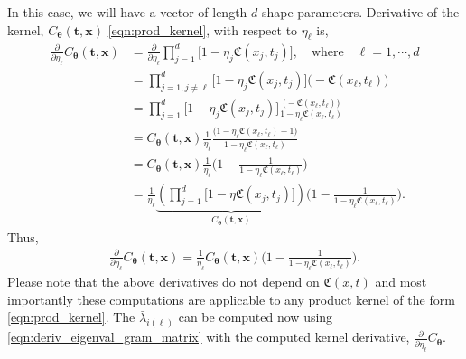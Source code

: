 \documentclass{iitthesis}          %
\newcommand{\bm}[1]{\boldsymbol{#1}}
\newcommand{\vtheta}{{\bm{\theta}}}
\newcommand{\vt}{\bm{t}}
\newcommand{\vx}{\bm{x}}
\begin{document}
In this case, we will have a vector of length $d$ shape parameters. Derivative of the kernel, $C_\vtheta(\vt, \vx)$ \eqref{eqn:prod_kernel}, with respect to $\eta_\ell$ is,
\begin{align*}
\frac{\partial}{\partial \eta_\ell} C_\vtheta(\vt, \vx) 
& =
\frac{\partial}{\partial \eta_\ell} 
\prod_{j=1}^d \biggl[
1 - \eta_j \mathfrak{C}(x_j,t_j) \biggr], \quad \text{where} \quad \ell = 1, \cdots, d
\\
& = 
\prod_{j=1, j \neq \ell}^d \biggl[
1 - \eta_j \mathfrak{C}(x_j,t_j) \biggr]
\biggl( - \mathfrak{C}(x_\ell,t_\ell) \biggr)
\\
& =
\prod_{j=1}^d \biggl[
1 - \eta_j \mathfrak{C}(x_j,t_j) \biggr]
\frac{
	\biggl( - \mathfrak{C}(x_\ell,t_\ell) \biggr)
}{
	1 - \eta_\ell \mathfrak{C}(x_\ell,t_\ell) 
}
\\
& =
C_\vtheta(\vt, \vx) 
\frac{1}{\eta_\ell}
\frac{
	\biggl(1 - \eta_\ell \mathfrak{C}(x_\ell,t_\ell)  - 1 \biggr)
}{
	1 - \eta_\ell \mathfrak{C}(x_\ell,t_\ell) 
}
\\
& =
C_\vtheta(\vt, \vx) 
\frac{1}{\eta_\ell}
\biggl(
1 - 
\frac{1
}{
	1 - \eta_\ell \mathfrak{C}(x_\ell,t_\ell) 
}
\biggr)
\\
& =
\frac{1}{\eta_\ell} 
\underbrace{
	\left(
	\prod_{j=1}^d \biggl[
	1 - \eta \mathfrak{C}(x_j,t_j) \biggr]
	\right) }_
{ C_\vtheta(\vt, \vx) }
\biggl(
1 - 
\frac{1}
{ 1 - \eta_\ell \mathfrak{C}(x_\ell, t_\ell) }
\biggr) 
.
\end{align*}
Thus, 
\begin{align*}
\frac{\partial}{\partial \eta_\ell} C_\vtheta(\vt, \vx) = \frac{1}{\eta_\ell} 
{ C_\vtheta(\vt, \vx) }
\biggl(
1 - 
\frac{1}
{ 1 - \eta_\ell \mathfrak{C}(x_\ell,t_\ell) }
\biggr).
\end{align*}
Please note that the above derivatives do not depend on $\mathfrak{C}(x,t)$ and most importantly these computations are applicable to any product kernel of the form \eqref{eqn:prod_kernel}.
The $\bar{\lambda}_{i(\ell)}$ can be computed now using \eqref{eqn:deriv_eigenval_gram_matrix} with the computed kernel derivative, $\frac{\partial}{\partial \eta_\ell} C_\vtheta$.
\end{document}
